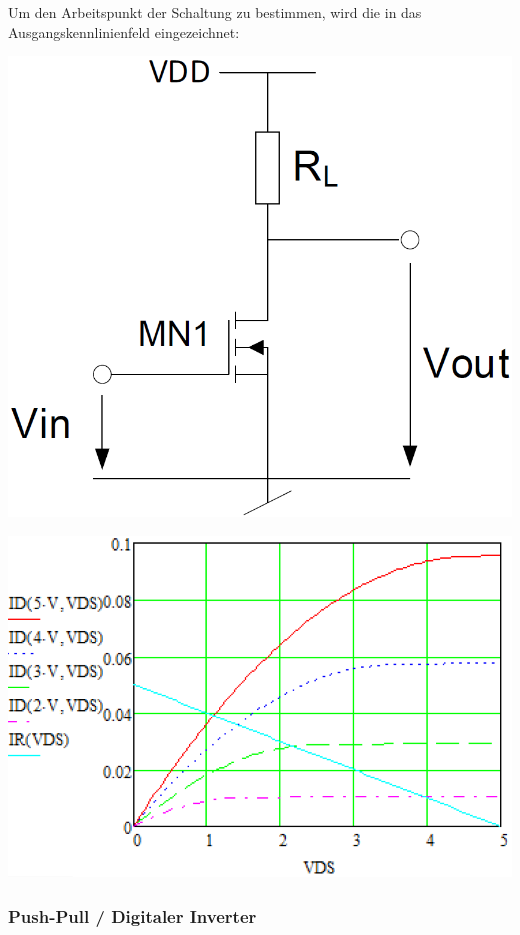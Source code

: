 Um den Arbeitspunkt der Schaltung zu bestimmen, wird die  in das
Ausgangskennlinienfeld eingezeichnet:

\begin{minipage}[c]{0.4\columnwidth}
    \includegraphics[width=0.9\columnwidth]{images/source_schaltung.png}
\end{minipage}
\hfill
\begin{minipage}[c]{0.5\columnwidth}
    \includegraphics[width=\columnwidth]{images/source_schaltung_lastgerade.png}
\end{minipage}


\subsubsection{Push-Pull / Digitaler Inverter}  %

